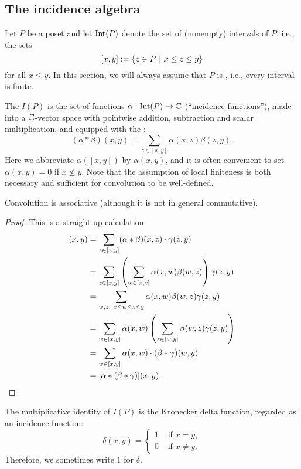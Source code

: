 \subsection{The incidence algebra}

Let $P$ be a poset and let $\operatorname{Int}(P)$ denote the set
of (nonempty) intervals of $P$, i.e., the sets
\[ [x,y] := \{z\in P ~|~ x\leq z\leq y\} \]
for all $x\leq y$.
In this section, we will always assume that $P$ is , i.e., every interval is finite.

\begin{definition}
The  $I(P)$ is the set of functions
$\alpha:\operatorname{Int}(P)\to\mathbb{C}$ (``incidence functions''), made into a $\mathbb{C}$-vector space with pointwise addition, subtraction
and scalar multiplication, and equipped with the :
\[(\alpha*\beta)(x,y) = \sum_{z\in[x,y]} \alpha(x,z)\beta(z,y).\]
Here we abbreviate $\alpha([x,y])$ by $\alpha(x,y)$, and it is often convenient to set $\alpha(x,y)=0$ if $x\not\leq y$.
Note that the assumption of local finiteness is both necessary and sufficient
for convolution to be well-defined.
\end{definition}

\begin{proposition}
Convolution is associative (although it is not in general commutative).
\end{proposition}
\begin{proof}
This is a straight-up calculation:
  \begin{align*}
  [(\alpha*\beta)*\gamma](x,y) &= \sum_{z\in[x,y]} (\alpha*\beta)(x,z)\cdot \gamma(z,y)\\
    &= \sum_{z\in[x,y]} \left( \sum_{w\in[x,z]} \alpha(x,w)\beta(w,z) \right) \gamma(z,y)\\
    &= \sum_{w,z: \ x\leq w\leq z\leq y} \alpha(x,w)\beta(w,z)\gamma(z,y)\\
    &= \sum_{w\in[x,y]} \alpha(x,w)\left( \sum_{z\in[w,y]} \beta(w,z)\gamma(z,y) \right)\\
    &= \sum_{w\in[x,y]} \alpha(x,w)\cdot (\beta*\gamma)(w,y) \\
    &= [\alpha*(\beta*\gamma)](x,y).\qedhere
  \end{align*}
\end{proof}

The multiplicative identity of $I(P)$ is the Kronecker delta function, regarded as an incidence function:
\[\delta(x,y) = \begin{cases} 1 & \text{ if } x=y,\\ 0 & \text{ if } x\neq y. \end{cases}\]
Therefore, we sometimes write $1$ for $\delta$.

